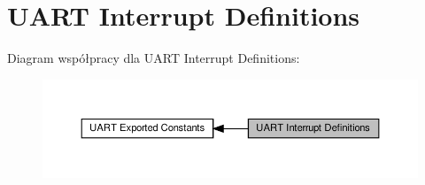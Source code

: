 \hypertarget{group___u_a_r_t___interrupt__definition}{}\section{U\+A\+RT Interrupt Definitions}
\label{group___u_a_r_t___interrupt__definition}
Diagram współpracy dla U\+A\+RT Interrupt Definitions\+:\nopagebreak
\begin{figure}[H]
\begin{center}
\leavevmode
\includegraphics[width=350pt]{group___u_a_r_t___interrupt__definition}
\end{center}
\end{figure}
